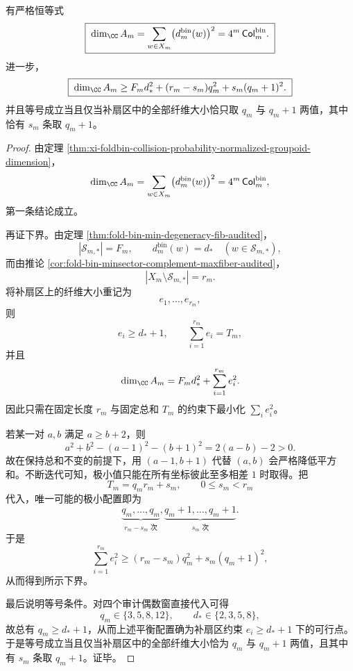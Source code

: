 \begin{theorem}[群胚代数维数与碰撞矩的严格等同及最小扇区平衡下界]\label{thm:xi-audited-even-groupoid-dimension-collision-balanced-lower-bound}
有严格恒等式
\[
\boxed{\;
\dim_{\CC}A_m
=
\sum_{w\in X_m}\bigl(d_m^{\mathrm{bin}}(w)\bigr)^2
=
4^m\,\mathsf{Col}^{\mathrm{bin}}_m.\;}
\]
进一步，
\[
\boxed{\;
\dim_{\CC}A_m
\ge
F_m d_*^2+(r_m-s_m)q_m^2+s_m(q_m+1)^2.\;}
\]
并且等号成立当且仅当补扇区中的全部纤维大小恰只取 \(q_m\) 与 \(q_m+1\) 两值，其中恰有 \(s_m\) 条取 \(q_m+1\)。
\end{theorem}
\begin{proof}
由定理 \ref{thm:xi-foldbin-collision-probability-normalized-groupoid-dimension}，
\[
\dim_{\CC}A_m
=
\sum_{w\in X_m}\bigl(d_m^{\mathrm{bin}}(w)\bigr)^2
=
4^m\,\mathsf{Col}^{\mathrm{bin}}_m,
\]
第一条结论成立。

再证下界。由定理 \ref{thm:fold-bin-min-degeneracy-fib-audited}，
\[
|\mathcal S_{m,*}|=F_m,
\qquad
d_m^{\mathrm{bin}}(w)=d_*
\quad (w\in\mathcal S_{m,*}),
\]
而由推论 \ref{cor:fold-bin-minsector-complement-maxfiber-audited}，
\[
|X_m\setminus \mathcal S_{m,*}|=r_m.
\]
将补扇区上的纤维大小重记为
\[
e_1,\dots,e_{r_m},
\]
则
\[
e_i\ge d_*+1,
\qquad
\sum_{i=1}^{r_m}e_i=T_m,
\]
并且
\[
\dim_{\CC}A_m
=
F_m d_*^2+\sum_{i=1}^{r_m}e_i^2.
\]
因此只需在固定长度 \(r_m\) 与固定总和 \(T_m\) 的约束下最小化
\(
\sum_i e_i^2
\)。

若某一对 \(a,b\) 满足 \(a\ge b+2\)，则
\[
a^2+b^2-(a-1)^2-(b+1)^2
=
2(a-b)-2
>0.
\]
故在保持总和不变的前提下，用 \((a-1,b+1)\) 代替 \((a,b)\) 会严格降低平方和。不断迭代可知，极小值只能在所有坐标彼此至多相差 \(1\) 时取得。把
\[
T_m=q_m r_m+s_m,\qquad 0\le s_m<r_m
\]
代入，唯一可能的极小配置即为
\[
\underbrace{q_m,\dots,q_m}_{r_m-s_m\text{ 次}},
\underbrace{q_m+1,\dots,q_m+1}_{s_m\text{ 次}}.
\]
于是
\[
\sum_{i=1}^{r_m}e_i^2
\ge
(r_m-s_m)q_m^2+s_m(q_m+1)^2,
\]
从而得到所示下界。

最后说明等号条件。对四个审计偶数窗直接代入可得
\[
q_m\in\{3,5,8,12\},
\qquad
d_*\in\{2,3,5,8\},
\]
故总有 \(q_m\ge d_*+1\)，从而上述平衡配置确为补扇区约束 \(e_i\ge d_*+1\) 下的可行点。于是等号成立当且仅当补扇区中的全部纤维大小恰为 \(q_m\) 与 \(q_m+1\) 两值，且其中有 \(s_m\) 条取 \(q_m+1\)。证毕。
\end{proof}

